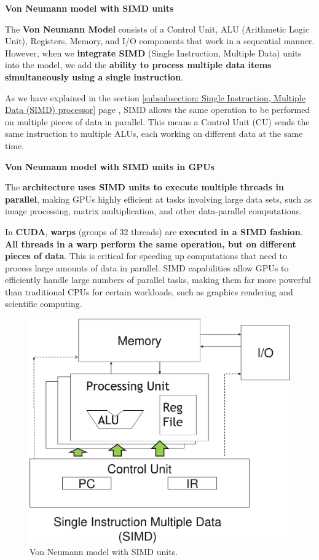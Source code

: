 \highspace
\begin{flushleft}
    \textcolor{Green3}{ \textbf{Von Neumann model with SIMD units}}
\end{flushleft}
The \textbf{Von Neumann Model} consists of a Control Unit, ALU (Arithmetic Logic Unit), Registers, Memory, and I/O components that work in a sequential manner. However, when we \textbf{integrate SIMD} (Single Instruction, Multiple Data) units into the model, we add the \textbf{ability to process multiple data items simultaneously using a single instruction}.

\highspace
As we have explained in the section \ref{subsubsection: Single Instruction, Multiple Data (SIMD) processor} page \pageref{subsubsection: Single Instruction, Multiple Data (SIMD) processor}, SIMD allows the same operation to be performed on multiple pieces of data in parallel. This means a Control Unit (CU) sends the same instruction to multiple ALUs, each working on different data at the same time.

\newpage

\begin{flushleft}
    \textcolor{Green3}{ \textbf{Von Neumann model with SIMD units in GPUs}}
\end{flushleft}
The \textbf{architecture uses SIMD units to execute multiple threads in parallel}, making GPUs highly efficient at tasks involving large data sets, such as image processing, matrix multiplication, and other data-parallel computations.

\highspace
In \textbf{CUDA}, \textbf{warps} (groups of 32 threads) are \textbf{executed in a SIMD fashion}. \textbf{All threads in a warp perform the same operation, but on different pieces of data}. This is critical for speeding up computations that need to process large amounts of data in parallel. SIMD capabilities allow GPUs to efficiently handle large numbers of parallel tasks, making them far more powerful than traditional CPUs for certain workloads, such as graphics rendering and scientific computing.

\begin{figure}[!htp]
    \centering
    \includegraphics[width=.6\textwidth]{img/von-neumann-model-with-simd-1.pdf}
    \caption{Von Neumann model with SIMD units.}
\end{figure}